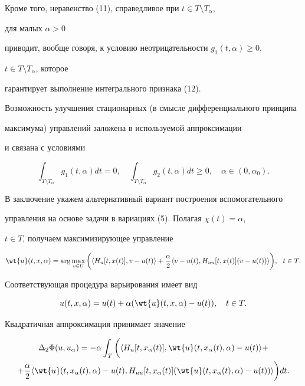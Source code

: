 Кроме того, неравенство (11), справедливое при $t\in T\setminus T_{\alpha}$, 


для малых $\alpha>0$


приводит, вообще говоря, к условию неотрицательности $g_1(t,\alpha)\geq 0$,


$t\in T\setminus T_{\alpha}$, которое 


гарантирует выполнение интегрального признака (12).


Возможность улучшения стационарных (в смысле дифференциального принципа 


максимума) управлений заложена в используемой аппроксимации 


и связана с условиями


$$


\int_{T\setminus T_{\alpha}}g_1(t,\alpha)dt=0,\quad


\int_{T\setminus T_{\alpha}}g_2(t,\alpha)dt\geq 0,\quad\alpha\in (0,\alpha_0).


$$





В заключение укажем альтернативный вариант построения вспомогательного 


управления на основе задачи в вариациях (5). Полагая $\chi(t)=\alpha$,


$t\in T$, получаем максимизирующее управление


\begin{equation}


\wt{u}(t,x,\alpha)=\arg\max_{v\in U}\bigg(\langle H_u[t,x(t)],v-u(t)\rangle+


\frac{\alpha}{2}\langle v-u(t),H_{uu}[t,x(t)](v-u(t))\rangle\bigg),


\ \ t \in T.


\end{equation}


 


Соответствующая процедура варьирования имеет вид


$$


u(t,x,\alpha)=u(t)+\alpha(\wt{u}(t,x,\alpha)-u(t)),\quad t\in T.


$$





Квадратичная аппроксимация принимает значение


\begin{multline*}


\Delta_2\Phi(u,u_{\alpha})=-\alpha\int_T\bigg(\langle H_u[t,x_{\alpha}(t)],


\wt{u}(t,x_{\alpha}(t),\alpha)-u(t)\rangle+\\


+\frac{\alpha}{2}\langle \wt{u}(t,x_{\alpha}(t),\alpha)-u(t),


H_{uu}[t,x_{\alpha}(t)](\wt{u}(t,x_{\alpha}(t),\alpha)-u(t))\rangle\bigg)dt.


\end{multline*} 


